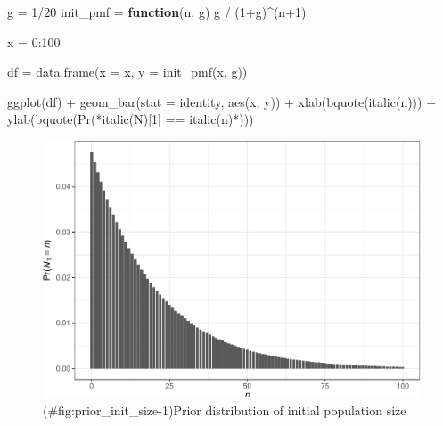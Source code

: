 \documentclass[
]{book}
\newenvironment{Shaded}{\begin{snugshade}}{\end{snugshade}}
\newcommand{\AttributeTok}[1]{\textcolor[rgb]{0.77,0.63,0.00}{#1}}
\newcommand{\ControlFlowTok}[1]{\textcolor[rgb]{0.13,0.29,0.53}{\textbf{#1}}}
\newcommand{\DecValTok}[1]{\textcolor[rgb]{0.00,0.00,0.81}{#1}}
\newcommand{\FunctionTok}[1]{\textcolor[rgb]{0.00,0.00,0.00}{#1}}
\newcommand{\NormalTok}[1]{#1}
\newcommand{\OtherTok}[1]{\textcolor[rgb]{0.56,0.35,0.01}{#1}}
\newcommand{\SpecialCharTok}[1]{\textcolor[rgb]{0.00,0.00,0.00}{#1}}
\newcommand{\StringTok}[1]{\textcolor[rgb]{0.31,0.60,0.02}{#1}}
\begin{document}
\begin{Shaded}
\begin{Highlighting}[]
\NormalTok{g }\OtherTok{=} \DecValTok{1}\SpecialCharTok{/}\DecValTok{20}
\NormalTok{init\_pmf }\OtherTok{=} \ControlFlowTok{function}\NormalTok{(n, g) g }\SpecialCharTok{/}\NormalTok{ (}\DecValTok{1}\SpecialCharTok{+}\NormalTok{g)}\SpecialCharTok{\^{}}\NormalTok{(n}\SpecialCharTok{+}\DecValTok{1}\NormalTok{)}

\NormalTok{x }\OtherTok{=} \DecValTok{0}\SpecialCharTok{:}\DecValTok{100}

\NormalTok{df }\OtherTok{=} \FunctionTok{data.frame}\NormalTok{(}\AttributeTok{x =}\NormalTok{ x, }\AttributeTok{y =} \FunctionTok{init\_pmf}\NormalTok{(x, g))}

\FunctionTok{ggplot}\NormalTok{(df) }\SpecialCharTok{+}
  \FunctionTok{geom\_bar}\NormalTok{(}\AttributeTok{stat =} \StringTok{\textquotesingle{}identity\textquotesingle{}}\NormalTok{, }\FunctionTok{aes}\NormalTok{(x, y)) }\SpecialCharTok{+}
  \FunctionTok{xlab}\NormalTok{(}\FunctionTok{bquote}\NormalTok{(}\FunctionTok{italic}\NormalTok{(n))) }\SpecialCharTok{+}
  \FunctionTok{ylab}\NormalTok{(}\FunctionTok{bquote}\NormalTok{(}\StringTok{\textquotesingle{}Pr(\textquotesingle{}}\SpecialCharTok{*}\FunctionTok{italic}\NormalTok{(N)[}\DecValTok{1}\NormalTok{] }\SpecialCharTok{==} \FunctionTok{italic}\NormalTok{(n)}\SpecialCharTok{*}\StringTok{\textquotesingle{})\textquotesingle{}}\NormalTok{))}
\end{Highlighting}
\end{Shaded}

\begin{figure}
\centering
\includegraphics{_main_files/figure-latex/prior_init_size-1.pdf}
\caption{(\#fig:prior\_init\_size-1)Prior distribution of initial population size}
\end{figure}
\end{document}
